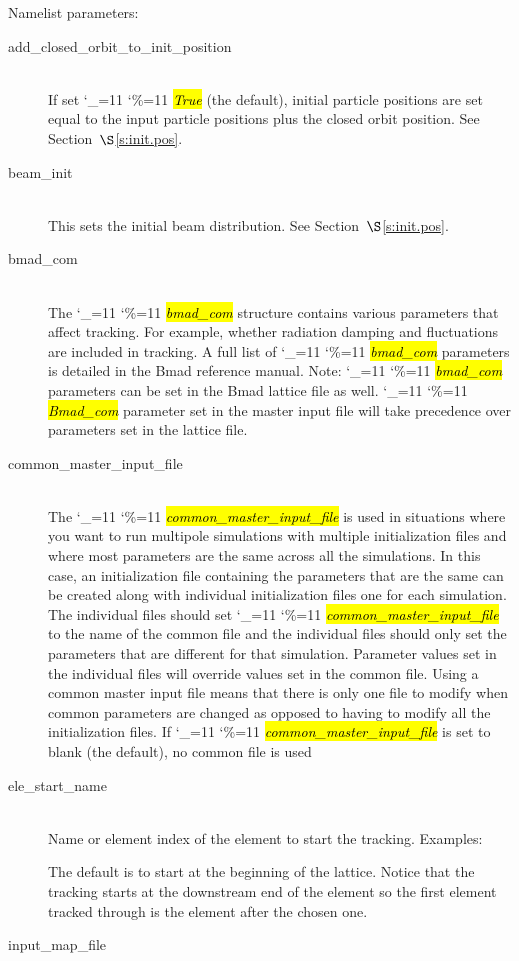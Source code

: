 \documentclass{hitec}
\newcommand\dottcmd[1]{\hl{\em#1}\endgroup}
\newcommand{\vn}{\begingroup\catcode`\_=11 \catcode`\%=11 \dottcmd}
\newcommand{\Newline}{\hfil \\}
\newcommand{\sref}[1]{$\S$\ref{#1}}
\begin{document}
{{{{{{Namelist parameters:
\begin{description}
\item[add_closed_orbit_to_init_position] \Newline
If set \vn{True} (the default), initial particle positions are set equal to the input particle positions
plus the closed orbit position. See Section~\sref{s:init.pos}.
%
\item[beam_init] \Newline
This sets the initial beam distribution. See Section~\sref{s:init.pos}.
%
\item[bmad_com] \Newline
The \vn{bmad_com} structure contains various parameters that affect tracking. For example, whether
radiation damping and fluctuations are included in tracking. A full list of \vn{bmad_com} parameters
is detailed in the Bmad reference manual. Note: \vn{bmad_com} parameters can be set in the Bmad
lattice file as well. \vn{Bmad_com} parameter set in the master input file will take precedence over
parameters set in the lattice file.
%
\item[common_master_input_file] \Newline
The \vn{common_master_input_file} is used in situations where you want to run multipole simulations
with multiple initialization files and where most parameters are the same across all the
simulations. In this case, an initialization file containing the parameters that are the same can be
created along with individual initialization files one for each simulation. The individual files
should set \vn{common_master_input_file} to the name of the common file and the individual files
should only set the parameters that are different for that simulation. Parameter values set in the
individual files will override values set in the common file. Using a common master input file means
that there is only one file to modify when common parameters are changed as opposed to having to
modify all the initialization files. If \vn{common_master_input_file} is set to blank (the default),
no common file is used
%
\item[ele_start_name] \Newline
Name or element index of the element to start the tracking. Examples:
The default is to start at the beginning of the lattice. Notice that the tracking starts at the
downstream end of the element so the first element tracked through is the element after the chosen
one.
%
\item[input_map_file] \Newline

\end{description}}}}}}}
\end{document}
